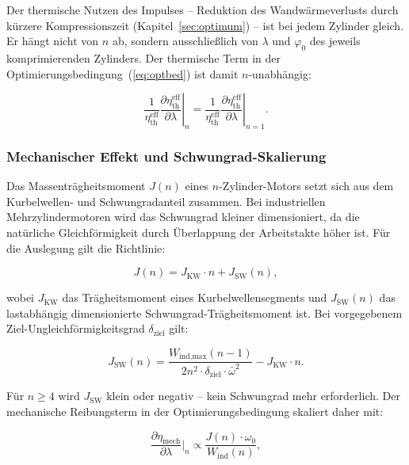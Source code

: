 ﻿\documentclass[a4paper,12pt]{article}
\begin{document}
Der thermische Nutzen des Impulses -- Reduktion des Wandwärmeverlusts durch
kürzere Kompressionszeit (Kapitel~\ref{sec:optimum}) -- ist bei jedem
Zylinder gleich. Er hängt nicht von $n$ ab, sondern ausschließlich von
$\lambda$ und $\varphi_0$ des jeweils komprimierenden Zylinders. Der
thermische Term in der Optimierungsbedingung~(\ref{eq:optbed}) ist
damit $n$-unabhängig:

\begin{equation}
  \left.\frac{1}{\eta_\text{th}^\text{eff}}
    \frac{\partial \eta_\text{th}^\text{eff}}{\partial \lambda}\right|_n
  = \left.\frac{1}{\eta_\text{th}^\text{eff}}
    \frac{\partial \eta_\text{th}^\text{eff}}{\partial \lambda}\right|_{n=1}.
  \label{eq:thermisch_n}
\end{equation}

\subsubsection*{Mechanischer Effekt und Schwungrad-Skalierung}

Das Massenträgheitsmoment $J(n)$ eines $n$-Zylinder-Motors setzt sich
aus dem Kurbelwellen- und Schwungradanteil zusammen. Bei industriellen
Mehrzylindermotoren wird das Schwungrad kleiner dimensioniert, da die
natürliche Gleichförmigkeit durch Überlappung der Arbeitstakte höher ist.
Für die Auslegung gilt die Richtlinie:

\begin{equation}
  J(n) = J_\text{KW} \cdot n + J_\text{SW}(n),
  \label{eq:J_n}
\end{equation}

\noindent
wobei $J_\text{KW}$ das Trägheitsmoment eines Kurbelwellensegments und
$J_\text{SW}(n)$ das lastabhängig dimensionierte Schwungrad-Trägheitsmoment
ist. Bei vorgegebenem Ziel-Ungleichförmigkeitsgrad $\delta_\text{ziel}$
gilt:

\begin{equation}
  J_\text{SW}(n) = \frac{W_\text{ind,max}(n-1)}{2n^2 \cdot \delta_\text{ziel}
    \cdot \bar{\omega}^2} - J_\text{KW} \cdot n.
  \label{eq:J_SW}
\end{equation}

Für $n \geq 4$ wird $J_\text{SW}$ klein oder negativ -- kein Schwungrad
mehr erforderlich. Der mechanische Reibungsterm in der Optimierungsbedingung
skaliert daher mit:

\begin{equation}
  \frac{\partial \eta_\text{mech}}{\partial \lambda}\bigg|_n
  \propto \frac{J(n) \cdot \omega_0}{W_\text{ind}(n)},
  \label{eq:mech_skalierung}
\end{equation}
\end{document}
